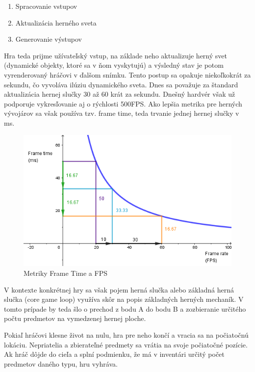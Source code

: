 \documentclass[slovak, master]{diploma}
\begin{document}
\begin{enumerate}
  \item Spracovanie vstupov
  \item Aktualizácia herného sveta
  \item Generovanie výstupov
\end{enumerate}

Hra teda prijme užívateľský vstup, na základe neho aktualizuje herný svet (dynamické objekty, ktoré sa v ňom vyskytujú) a výsledný stav je potom vyrenderovaný hráčovi v ďalšom snímku. Tento postup sa opakuje niekoľkokrát za sekundu, čo vyvoláva ilúziu dynamického sveta. Dnes sa považuje za štandard aktualizácia hernej slučky 30 až 60 krát za sekundu. Dnešný hardvér však už podporuje vykresľovanie aj o rýchlosti 500FPS. Ako lepšia metrika pre herných vývojárov sa však používa tzv. frame time, teda trvanie jednej hernej slučky v ms.

\begin{figure}[!htbp]
	\centering
	\includegraphics[width=.9\textwidth]{Figures/frameTimeVsFPS.png}
	\caption{Metriky Frame Time a FPS \cite{FrameTimeFPS}}
	\label{pic:FrameTimeFPS}
\end{figure}

V kontexte konkrétnej hry sa však pojem herná slučka alebo základná herná slučka (core game loop) využíva skôr na popis základných herných mechaník. V tomto prípade by teda šlo o prechod z bodu A do bodu B a zozbieranie určitého počtu predmetov na vymedzenej hernej ploche.

Pokiaľ hráčovi klesne život na nulu, hra pre neho končí a vracia sa na počiatočnú lokáciu. Nepriatelia a zbierateľné predmety sa vrátia na svoje počiatočné pozície. Ak hráč dôjde do cieľa a splní podmienku, že má v inventári určitý počet predmetov daného typu, hru vyhráva. 
\end{document}
